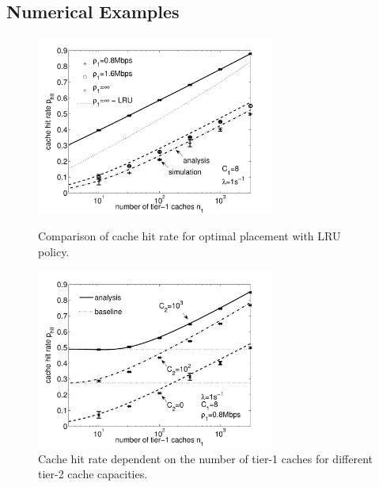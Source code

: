 \subsection{Numerical Examples}\label{sec:hierarchical:analyticbw:results}

\begin{figure}[!tb]
\begin{minipage}[t]{\textwidth}
  \centering
  \includegraphics[width=0.7\textwidth]{hierarchical/analyticbw/figures/hwc_CISP0}
  \caption{Comparison of cache hit rate for optimal placement with LRU policy.}
  \label{fig:hwc_CISP0}
\end{minipage}
\begin{minipage}[t]{\textwidth}
  \centering
  \includegraphics[width=0.7\textwidth]{hierarchical/analyticbw/figures/hwc_l1C8_C2}
  \caption{Cache hit rate dependent on the number of tier-1 caches for different tier-2 cache capacities.}
  \label{fig:hwc_l1C8_C2}
\end{minipage}
\end{figure}

